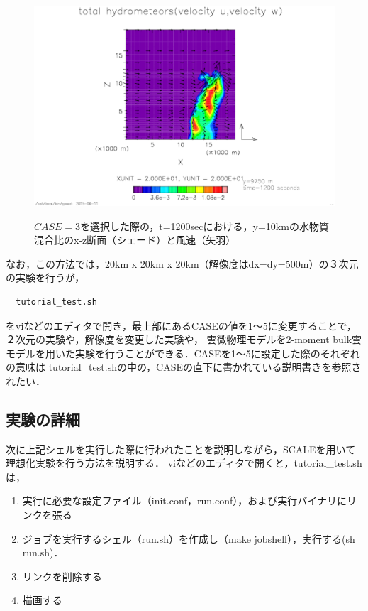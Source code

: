 \begin{figure}[t]
\begin{center}
  \includegraphics[width=0.9\hsize]{./figure/gpview_hist_ideal.eps}\\
  \caption{$CASE=3$を選択した際の，t=1200secにおける，y=10kmの水物質混合比のx-z断面（シェード）と風速（矢羽）}
  \label{fig3.1}
\end{center}
\end{figure}

なお，この方法では，20km x 20km x 20km（解像度はdx=dy=500m）の３次元の実験を行うが，
\begin{verbatim}
  tutorial_test.sh
\end{verbatim}
をviなどのエディタで開き，最上部にあるCASEの値を1〜5に変更することで，２次元の実験や，解像度を変更した実験や，
雲微物理モデルを2-moment bulk雲モデルを用いた実験を行うことができる．CASEを1〜5に設定した際のそれぞれの意味は
tutorial\_test.shの中の，CASEの直下に書かれている説明書きを参照されたい．

\subsection{実験の詳細}
次に上記シェルを実行した際に行われたことを説明しながら，SCALEを用いて理想化実験を行う方法を説明する．
viなどのエディタで開くと，tutorial\_test.shは，

\begin{enumerate}
\item 実行に必要な設定ファイル（init.conf，run.conf），および実行バイナリにリンクを張る
\item ジョブを実行するシェル（run.sh）を作成し（make jobshell），実行する(sh run.sh)．
\item リンクを削除する
\item 描画する
\end{enumerate}

